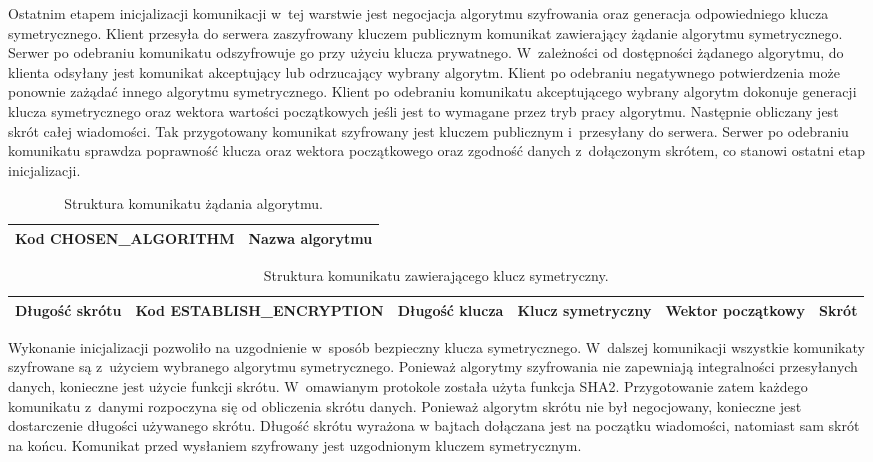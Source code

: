 Ostatnim etapem inicjalizacji komunikacji w~tej warstwie jest
negocjacja algorytmu szyfrowania oraz generacja odpowiedniego klucza
symetrycznego. Klient przesyła do serwera zaszyfrowany kluczem
publicznym komunikat zawierający żądanie algorytmu
symetrycznego. Serwer po odebraniu komunikatu odszyfrowuje go przy
użyciu klucza prywatnego. W~zależności od dostępności żądanego
algorytmu, do klienta odsyłany jest komunikat akceptujący lub
odrzucający wybrany algorytm. Klient po odebraniu negatywnego
potwierdzenia może ponownie zażądać innego algorytmu
symetrycznego. Klient po odebraniu komunikatu akceptującego wybrany
algorytm dokonuje generacji klucza symetrycznego oraz wektora wartości
początkowych jeśli jest to wymagane przez tryb pracy algorytmu.
Następnie obliczany jest skrót całej wiadomości. Tak przygotowany
komunikat szyfrowany jest kluczem publicznym i~przesyłany do
serwera. Serwer po odebraniu komunikatu sprawdza poprawność klucza
oraz wektora początkowego oraz zgodność danych z~dołączonym skrótem,
co stanowi ostatni etap inicjalizacji.

\begin{table}[H]
\centering
\caption{Struktura komunikatu żądania algorytmu. }

\begin{tabular}{|p{5cm}|p{6cm}|}
\hline
\raggedright{Kod CHOSEN\_ALGORITHM} & Nazwa algorytmu\\
\hline
\end{tabular}
\end{table}

\begin{table}[H]
\centering
\caption{Struktura komunikatu zawierającego klucz symetryczny.}
\begin{tabular}{|p{1.5cm}|p{4cm}|p{2cm}|p{2.5cm}|p{2cm}|p{1cm}|}
\hline \raggedright{Długość skrótu} & \raggedright{Kod
  ESTABLISH\_ENCRYPTION} & \raggedright{Długość klucza} &
\raggedright{Klucz symetryczny} & \raggedright{Wektor początkowy} &
Skrót \\ \hline
\end{tabular}
\end{table}

Wykonanie inicjalizacji pozwoliło na uzgodnienie w~sposób bezpieczny
klucza symetrycznego. W~dalszej komunikacji wszystkie komunikaty
szyfrowane są z~użyciem wybranego algorytmu symetrycznego. Ponieważ
algorytmy szyfrowania nie zapewniają integralności przesyłanych
danych, konieczne jest użycie funkcji skrótu. W~omawianym protokole
została użyta funkcja SHA2. Przygotowanie zatem każdego komunikatu
z~danymi rozpoczyna się od obliczenia skrótu danych. Ponieważ algorytm
skrótu nie był negocjowany, konieczne jest dostarczenie długości
używanego skrótu. Długość skrótu wyrażona w bajtach dołączana jest na
początku wiadomości, natomiast sam skrót na końcu. Komunikat przed
wysłaniem szyfrowany jest uzgodnionym kluczem symetrycznym.

